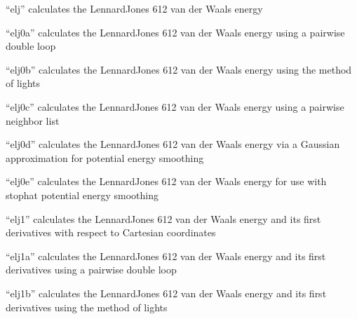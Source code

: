 \documentclass[letterpaper,11pt,english]{sphinxmanual}
\begin{document}
\sphinxAtStartPar
{}

\sphinxAtStartPar
“elj” calculates the Lennard\sphinxhyphen{}Jones 6\sphinxhyphen{}12 van der Waals energy

\sphinxAtStartPar
{}

\sphinxAtStartPar
“elj0a” calculates the Lennard\sphinxhyphen{}Jones 6\sphinxhyphen{}12 van der Waals energy using a pairwise double loop

\sphinxAtStartPar
{}

\sphinxAtStartPar
“elj0b” calculates the Lennard\sphinxhyphen{}Jones 6\sphinxhyphen{}12 van der Waals energy using the method of lights

\sphinxAtStartPar
{}

\sphinxAtStartPar
“elj0c” calculates the Lennard\sphinxhyphen{}Jones 6\sphinxhyphen{}12 van der Waals energy using a pairwise neighbor list

\sphinxAtStartPar
{}

\sphinxAtStartPar
“elj0d” calculates the Lennard\sphinxhyphen{}Jones 6\sphinxhyphen{}12 van der Waals energy via a Gaussian approximation for potential energy smoothing

\sphinxAtStartPar
{}

\sphinxAtStartPar
“elj0e” calculates the Lennard\sphinxhyphen{}Jones 6\sphinxhyphen{}12 van der Waals energy for use with stophat potential energy smoothing

\sphinxAtStartPar
{}

\sphinxAtStartPar
“elj1” calculates the Lennard\sphinxhyphen{}Jones 6\sphinxhyphen{}12 van der Waals energy and its first derivatives with respect to Cartesian coordinates

\sphinxAtStartPar
{}

\sphinxAtStartPar
“elj1a” calculates the Lennard\sphinxhyphen{}Jones 6\sphinxhyphen{}12 van der Waals energy and its first derivatives using a pairwise double loop

\sphinxAtStartPar
{}

\sphinxAtStartPar
“elj1b” calculates the Lennard\sphinxhyphen{}Jones 6\sphinxhyphen{}12 van der Waals energy and its first derivatives using the method of lights

\sphinxAtStartPar
{}
\end{document}
